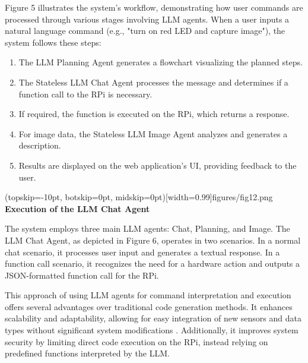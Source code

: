 \documentclass{ieeeaccess}
\begin{document}
Figure 5 illustrates the system's workflow, demonstrating how user commands are processed through various stages involving LLM agents. When a user inputs a natural language command (e.g., "turn on red LED and capture image"), the system follows these steps:

\begin{enumerate}
    \item The LLM Planning Agent generates a flowchart visualizing the planned steps.
    \item The Stateless LLM Chat Agent processes the message and determines if a function call to the RPi is necessary.
    \item If required, the function is executed on the RPi, which returns a response.
    \item For image data, the Stateless LLM Image Agent analyzes and generates a description.
    \item Results are displayed on the web application's UI, providing feedback to the user.
\end{enumerate}

\Figure[b!](topskip=-10pt, botskip=0pt,
midskip=0pt)[width=0.99\columnwidth]{{figures/fig12.png}}
{ \textbf{Execution of the LLM Chat Agent}\label{fig6}}

The system employs three main LLM agents: Chat, Planning, and Image. The LLM Chat Agent, as depicted in Figure 6, operates in two scenarios. In a normal chat scenario, it processes user input and generates a textual response. In a function call scenario, it recognizes the need for a hardware action and outputs a JSON-formatted function call for the RPi.

This approach of using LLM agents for command interpretation and execution offers several advantages over traditional code generation methods. It enhances scalability and adaptability, allowing for easy integration of new sensors and data types without significant system modifications \cite{yang2023autogptonlinedecisionmaking}. Additionally, it improves system security by limiting direct code execution on the RPi, instead relying on predefined functions interpreted by the LLM.


\end{document}
